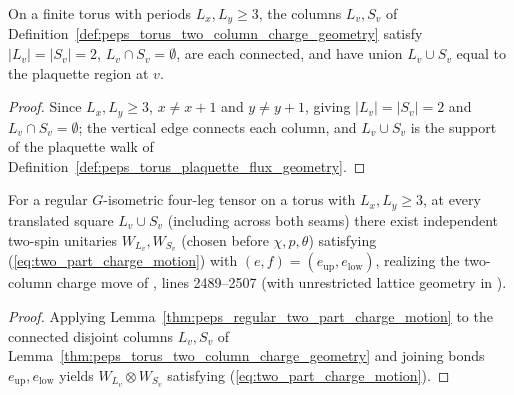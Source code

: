 \begin{lemma}
    \label{thm:peps_torus_two_column_charge_geometry}
    \leanok
    On a finite torus with periods $L_x,L_y\ge 3$, the columns $L_v,S_v$ of Definition~\ref{def:peps_torus_two_column_charge_geometry} satisfy $|L_v|=|S_v|=2$, $L_v\cap S_v=\emptyset$, are each connected, and have union $L_v\cup S_v$ equal to the plaquette region at $v$.
\end{lemma}
\begin{proof}\leanok
    Since $L_x,L_y\ge 3$, $x\neq x+1$ and $y\neq y+1$, giving $|L_v|=|S_v|=2$ and $L_v\cap S_v=\emptyset$; the vertical edge connects each column, and $L_v\cup S_v$ is the support of the plaquette walk of Definition~\ref{def:peps_torus_plaquette_flux_geometry}.
\end{proof}

\begin{lemma}
    \label{thm:peps_torus_two_column_charge_motion}
    \leanok
    For a regular $G$-isometric four-leg tensor on a torus with $L_x,L_y\ge 3$, at every translated square $L_v\cup S_v$ (including across both seams) there exist independent two-spin unitaries $W_{L_v},W_{S_v}$ (chosen before $\chi,p,\theta$) satisfying (\ref{eq:two_part_charge_motion}) with $(e,f)=(e_{\mathrm{up}},e_{\mathrm{low}})$, realizing the two-column charge move of \cite[Section~6.6]{Schuch2010PEPS}, lines 2489--2507 (with unrestricted lattice geometry in \cite{gap:rmp_peps_quantum_double_g_isometry}).
\end{lemma}
\begin{proof}\leanok
    Applying Lemma~\ref{thm:peps_regular_two_part_charge_motion} to the connected disjoint columns $L_v,S_v$ of Lemma~\ref{thm:peps_torus_two_column_charge_geometry} and joining bonds $e_{\mathrm{up}},e_{\mathrm{low}}$ yields $W_{L_v}\otimes W_{S_v}$ satisfying (\ref{eq:two_part_charge_motion}).
\end{proof}
